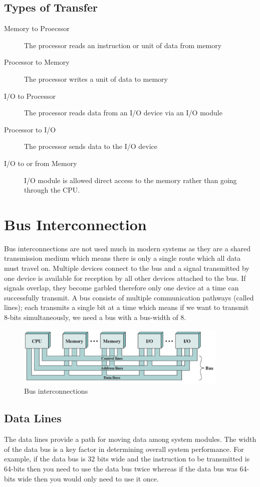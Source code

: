 \subsection{Types of Transfer}
\begin{description}
    \item[Memory to Proecssor] The processor reads an instruction or unit of data from memory
    \item[Processor to Memory] The processor writes a unit of data to memory
    \item[I/O to Processor] The processor reads data from an I/O device via an I/O module
    \item[Processor to I/O] The processor sends data to the I/O device
    \item[I/O to or from Memory] I/O module is allowed direct access to the memory rather than going through the CPU.
\end{description}

\section{Bus Interconnection}
Bus interconnections are not used much in modern systems as they are a shared transmission medium which means there is only a single route which all data must travel on. Multiple devices connect to the bus and a signal transmitted by one device is available for reception by all other devices attached to the bus. If signals overlap, they become garbled therefore only one device at a time can successfully transmit. A bus consists of multiple communication pathways (called lines); each transmits a single bit at a time which means if we want to transmit 8-bits simultaneously, we need a bus with a bus-width of 8. 
\begin{figure}[H]
    \centering
    \includegraphics[width=0.9\textwidth]{assets/bus-interconnection.png} 
    \caption*{Bus interconnections}
\end{figure}
\subsection{Data Lines}
The data lines provide a path for moving data among system modules. The width of the data bus is a key factor in determining overall system performance. For example, if the data bus is 32 bits wide and the instruction to be transmitted is 64-bits then you need to use the data bus twice whereas if the data bus was 64-bits wide then you would only need to use it once.

